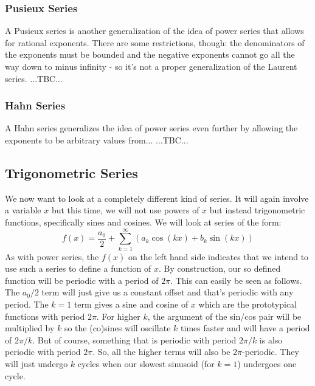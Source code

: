\subsubsection{Pusieux Series}
A Pusieux series is another generalization of the idea of power series that allows for rational exponents. There are some restrictions, though: the denominators of the exponents must be bounded and the negative exponents cannot go all the way down to minus infinity - so it's not a proper generalization of the Laurent series. ...TBC...



\subsubsection{Hahn Series}
A Hahn series generalizes the idea of power series even further by allowing the exponents to be arbitrary values from... ...TBC...



\subsection{Trigonometric Series}
We now want to look at a completely different kind of series. It will again involve a variable $x$ but this time, we will not use powers of $x$ but instead trigonometric functions, specifically sines and cosines. We will look at series of the form:
\begin{equation}
\label{Eq:FourierSeries}
 f(x) = \frac{a_0}{2} + \sum_{k=1}^\infty \left(  a_k \cos(k x) + b_k \sin(k x) \right)
\end{equation}
As with power series, the $f(x)$ on the left hand side indicates that we intend to use such a series to define a function of $x$. By construction, our so defined function will be periodic with a period of $2\pi$. This can easily be seen as follows. The $a_0/2$ term will just give us a constant offset and that's periodic with any period. The $k=1$ term gives a sine and cosine of $x$ which are the prototypical functions with period $2\pi$. For higher $k$, the argument of the sin/cos pair will be multiplied by $k$ so the (co)sines will oscillate $k$ times faster and will have a period of $2\pi/k$. But of course, something that is periodic with period $2\pi/k$ is also periodic with period $2\pi$. So, all the higher terms will also be $2\pi$-periodic. They will just undergo $k$ cycles when our slowest sinusoid (for $k=1$) undergoes one cycle.

